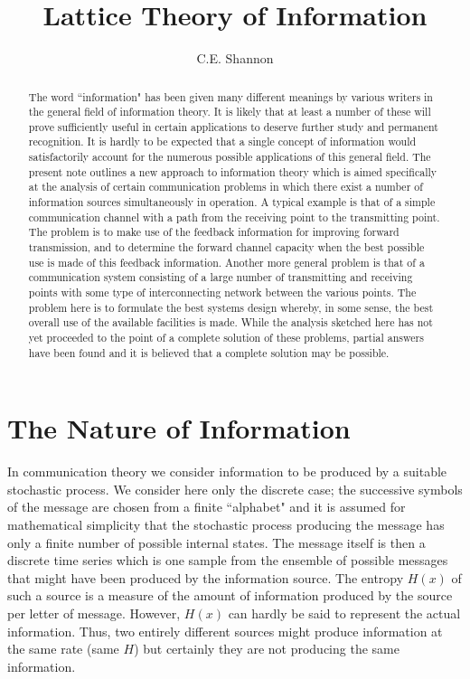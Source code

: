 \documentclass{article}[12pt, letter]
\title{Lattice Theory of Information}
\author{C.E. Shannon}
\date{}
\begin{document}
\maketitle

\begin{abstract}
	The word ``information" has been given many different meanings by various writers in the general field of information theory. It is likely that at
	least a number of these will prove sufficiently useful in certain applications to deserve further study and permanent recognition. It is hardly to be
	expected that a single concept of information would satisfactorily account for the numerous possible applications of this general field. The present note outlines a new approach to information theory which is aimed specifically at the analysis of certain communication problems in which there exist a number of information sources simultaneously in operation. A typical example is that 	of a simple communication channel with a path from the receiving point to the transmitting point. The problem is to make use of the feedback information for improving forward transmission, and to determine the forward channel capacity when the best possible use is made of this feedback information. Another more general problem is that of a communication system consisting of a large number of transmitting and receiving points with some type of interconnecting network between the various points. The problem here is to formulate the best systems design whereby, in some sense, the best overall use of the available facilities is made. While the analysis sketched here has not yet proceeded to the point of a complete solution of these problems, partial answers have been found and it is believed that a complete solution may be possible.
\end{abstract}

\section{The Nature of Information}

In communication theory we consider information to be produced by a suitable stochastic process. We consider here only the discrete case; the
successive symbols of the message are chosen from a finite ``alphabet" and it is assumed for mathematical simplicity that the stochastic process producing the message has only a finite number of possible internal states. The message itself is then a discrete time series which is one sample from the ensemble of possible messages that might have been produced by the information source. The entropy $H(x)$ of such a source is a measure of the amount of information produced by the source per letter of message. However, $H(x)$ can hardly be said to represent the actual information. Thus, two entirely different sources might produce information at the same rate (same $H$) but certainly they are not producing the same information.
\end{document}

